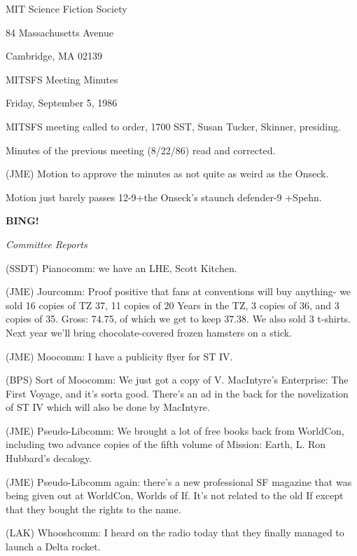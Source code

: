 \documentclass[12pt]{article}
\newcommand{\bing}{{\bf BING!} }
\newcommand{\goto}[1]{\bing \vskip 12pt \centerline{{\em{#1}}}}
\begin{document}
\begin{center}

MIT Science Fiction Society 

84 Massachusetts Avenue

Cambridge, MA 02139

\vspace{12pt}

MITSFS Meeting Minutes 

Friday, September 5, 1986

\end{center}
 
\vspace{18pt}

\setlength{\parskip}{6pt}

\noindent
MITSFS meeting called to order, 1700 SST,
Susan Tucker, Skinner, presiding.

Minutes of the previous meeting (8/22/86) read and corrected.

(JME) Motion to approve the minutes as not quite as weird as the Onseck.

Motion just barely passes 12-9+the Onseck's staunch defender-9 +Spehn.

\goto{Committee Reports}

(SSDT) Pianocomm: we have an LHE, Scott Kitchen.

(JME) Jourcomm: Proof positive that fans at conventions will buy anything- we sold 16 copies of TZ 37, 11 copies of 20 Years in the TZ, 3 copies of 36, and 3 copies of 35. Gross: 74.75, of which we get to keep 37.38. We also sold 3 t-shirts. Next year we'll bring chocolate-covered frozen hamsters on a stick.

(JME) Moocomm: I have a publicity flyer for ST IV.

(BPS) Sort of Moocomm: We just got a copy of V. MacIntyre's Enterprise: The First Voyage, and it's sorta good. There's an ad in the back for the novelization of ST IV which will also be done by MacIntyre.

(JME) Pseudo-Libcomm: We brought a lot of free books back from WorldCon, including two advance copies of the fifth volume of Mission: Earth, L. Ron Hubbard's decalogy.

(JME) Pseudo-Libcomm again: there's a new professional SF magazine that was being given out at WorldCon, Worlds of If. It's not related to the old If except that they bought the rights to the name.

(LAK) Whooshcomm: I heard on the radio today that they finally managed to launch a Delta rocket.
\end{document}
